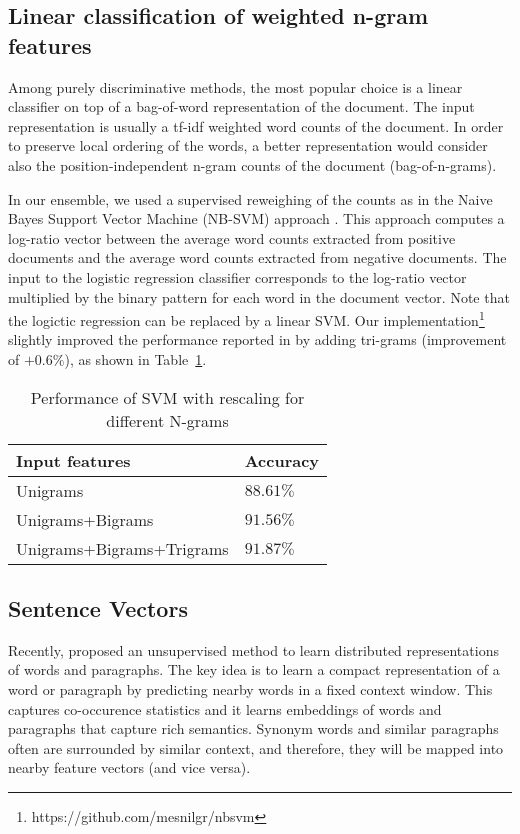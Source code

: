 \documentclass{article} %
\begin{document}
\subsection{Linear classification of weighted n-gram features}

Among purely discriminative methods, the most popular choice is a linear
classifier on top of a bag-of-word representation of the document. The input
representation is usually a tf-idf weighted word counts of the document. In
order to preserve local ordering of the words, a better representation would
consider also the position-independent n-gram counts of the document
(bag-of-n-grams).

In our ensemble, we used a supervised reweighing of the counts as in the Naive
Bayes Support Vector Machine (NB-SVM) approach \citep{Wang2012}.  This approach computes
a log-ratio vector between the average word counts extracted from positive
documents and the average word counts extracted from negative documents.  The
input to the logistic regression classifier corresponds to the log-ratio vector
multiplied by the binary pattern for each word in the document vector. Note
that the logictic regression can be replaced by a linear SVM. Our
implementation\footnote{https://github.com/mesnilgr/nbsvm} slightly improved
the performance reported in \citep{Wang2012} by adding tri-grams (improvement
of $+0.6\%$), as shown in Table~\ref{tab:svm}.

\begin{table}[t]
\caption{Performance of SVM with \cite{Wang2012} rescaling for different N-grams}
\label{tab:svm}
\begin{center}
\begin{tabular}{ll}
\hline
Input features & Accuracy \\
\hline
Unigrams & $88.61\%$ \\
Unigrams+Bigrams & $91.56\%$ \\
Unigrams+Bigrams+Trigrams & $91.87\%$ \\
\hline
\end{tabular}
\end{center}
\end{table}


\subsection{Sentence Vectors}

Recently, \citep{Le2014} proposed an unsupervised method to
learn distributed representations of words and paragraphs. The key idea is to
learn a compact representation of a word or paragraph by predicting nearby
words in a fixed context window. This captures co-occurence statistics and it
learns embeddings of words and paragraphs that capture rich semantics. Synonym
words and similar paragraphs often are surrounded by similar context, and
therefore, they will be mapped into nearby feature vectors (and vice versa). 
\end{document}

